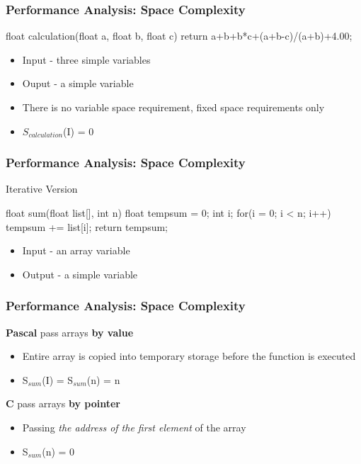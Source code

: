 \documentclass[newPxFont,sthlmFooter,nooffset]{beamer}
\begin{document}
\begin{frame}[t, fragile]
  \frametitle{Performance Analysis: Space Complexity}
\begin{codedef}
float calculation(float a, float b, float c) { 
   return a+b+b*c+(a+b-c)/(a+b)+4.00;
}    
\end{codedef}
\begin{itemize}
\item Input - three simple variables
\item Ouput - a simple variable
\item There is no variable space requirement, fixed space requirements only
\item $S_{calculation}$(I) = 0
\end{itemize}

\end{frame}

\begin{frame}[t, fragile]
  \frametitle{Performance Analysis: Space Complexity}
Iterative Version
\begin{codedef}
float sum(float list[], int n) { 
   float tempsum = 0;
   int i;
   for(i = 0; i < n; i++)
      tempsum += list[i];
      return tempsum;
}
\end{codedef}
\begin{itemize}
\item Input - an array variable
\item Output - a simple variable
\end{itemize}
\end{frame}

\begin{frame}[t]
  \frametitle{Performance Analysis: Space Complexity}
\textbf{Pascal} pass arrays \textbf{by value}
\begin{itemize}
\item Entire array is copied into temporary storage before the
  function is executed
\item S$_{sum}$(I) = S$_{sum}$(n) = n
\end{itemize}

\textbf{C} pass arrays \textbf{by pointer}
\begin{itemize}
\item Passing \textit{the address of the first element} of the array
\item S$_{sum}$(n) = 0
\end{itemize}

\end{frame}
\end{document}
